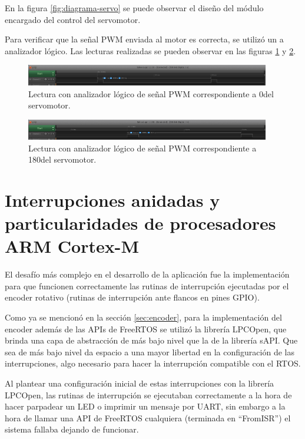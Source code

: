 \documentclass{IEEEtran}
\begin{document}
En la figura \ref{fig:diagrama-servo} se puede observar el diseño del módulo encargado del control del servomotor.

Para verificar que la señal PWM enviada al motor es correcta, se utilizó un a analizador lógico. Las lecturas realizadas se pueden observar en las figuras \ref{fig:sct-pwm-min} y \ref{fig:sct-pwm-max}.

\begin{figure}[ht]
    \centering
    \includegraphics[width=0.95\textwidth]{../sct_pwm_min.png}
    \caption{Lectura con analizador lógico de señal PWM correspondiente a 0\degree del servomotor.}
    \label{fig:sct-pwm-min}
\end{figure}

\begin{figure}[ht]
    \centering
    \includegraphics[width=0.95\textwidth]{../sct_pwm_max.png}
    \caption{Lectura con analizador lógico de señal PWM correspondiente a 180\degree del servomotor.}
    \label{fig:sct-pwm-max}
\end{figure}

\section{Interrupciones anidadas y particularidades de procesadores ARM Cortex-M}
El desafío más complejo en el desarrollo de la aplicación fue la implementación para que funcionen correctamente las rutinas de interrupción ejecutadas por el encoder rotativo (rutinas de interrupción ante flancos en pines GPIO).

Como ya se mencionó en la sección \ref{sec:encoder}, para la implementación del encoder además de las APIs de FreeRTOS se utilizó la librería LPCOpen, que brinda una capa de abstracción de más bajo nivel que la de la librería sAPI. Que sea de más bajo nivel da espacio a una mayor libertad en la configuración de las interrupciones, algo necesario para hacer la interrupción compatible con el RTOS.

Al plantear una configuración inicial de estas interrupciones con la librería LPCOpen, las rutinas de interrupción se ejecutaban correctamente a la hora de hacer parpadear un LED o imprimir un mensaje por UART, sin embargo a la hora de llamar una API de FreeRTOS cualquiera (terminada en ``FromISR'') el sistema fallaba dejando de funcionar.
\end{document}
